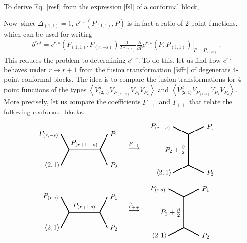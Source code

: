 \documentclass[12pt, a4paper]{article}
\theoremstyle{break}
\begin{document}
To derive Eq. \eqref{resf} from the expression \eqref{fsl} of a conformal block, 

Now, since $\Delta_{(1,1)}=0$, $c^{r,s}(P_{(1,1)},P)$ is in fact a ratio of 2-point functions, which can be used for writing 
\begin{align}
 b^{r,s} = c^{r,s}\left(P_{(1,1)}, P_{(r,-s)}\right)  \frac{1}{2P_{(r,s)}}\left.\frac{\partial}{\partial P} c^{r,s}\left(P,P_{(1,1)}\right)\right|_{P=P_{(r,s)}}\ . 
 \label{bcdc}
\end{align}
This reduces the problem to determining $c^{r,s}$. To do this, let us find how $c^{r,s}$ behaves under $r\to r+1$ from the fusion transformation \eqref{fsfft} of degenerate 4-point conformal blocks. The idea is to compare the fusion transformations for 4-point functions of the types $\left<V^d_{\langle 2,1\rangle}V_{P_{(r,-s)}}V_{P_1}V_{P_2}\right>$ and $\left<V^d_{\langle 2,1\rangle}V_{P_{(r,s)}}V_{P_1}V_{P_2}\right>$. More precisely, let us compare the coefficients $F_{++}$ and $\widetilde{F}_{++}$ that relate the following conformal blocks:
\begin{align}
  \begin{tikzpicture}[baseline=(current  bounding  box.center), very thick, scale = .4]
\draw (-1,2) node [left] {$P_{(r,-s)}$} -- (0,0) -- node [above] {$P_{(r+1,-s)}$} (4,0) -- (5,2) node [right] {$P_1$};
\draw (-1,-2) node [left] {$\langle 2,1\rangle\!$} -- (0,0);
\draw (4,0) -- (5,-2) node [right] {$P_2$};
\end{tikzpicture}
\quad \overset{F_{++}}{\longrightarrow} \quad 
\begin{tikzpicture}[baseline=(current  bounding  box.center), very thick, scale = .4]
 \draw (-2,3) node [left] {$P_{(r,-s)}$} -- (0,2) -- node [left] {$P_2+\frac{\beta}{2}$} (0,-2) -- (-2, -3) node [left] {$\langle 2,1\rangle\!$};
\draw (0,2) -- (2,3) node [right] {$P_1$};
\draw (0,-2) -- (2, -3) node [right] {$P_2$};
\end{tikzpicture}
\end{align}
\begin{align}
\begin{tikzpicture}[baseline=(current  bounding  box.center), very thick, scale = .4]
\draw (-1,2) node [left] {$P_{(r,s)}$} -- (0,0) -- node [above] {$P_{(r+1,s)}$} (4,0) -- (5,2) node [right] {$P_1$};
\draw (-1,-2) node [left] {$\langle 2,1\rangle\!$} -- (0,0);
\draw (4,0) -- (5,-2) node [right] {$P_2$};
\end{tikzpicture}
\quad \overset{\widetilde{F}_{++}}{\longrightarrow} \quad 
\begin{tikzpicture}[baseline=(current  bounding  box.center), very thick, scale = .4]
 \draw (-2,3) node [left] {$P_{(r,s)}$} -- (0,2) -- node [left] {$P_2+\frac{\beta}{2}$} (0,-2) -- (-2, -3) node [left] {$\langle 2,1\rangle\!$};
\draw (0,2) -- (2,3) node [right] {$P_1$};
\draw (0,-2) -- (2, -3) node [right] {$P_2$};
\end{tikzpicture}
\end{align}
\end{document}
